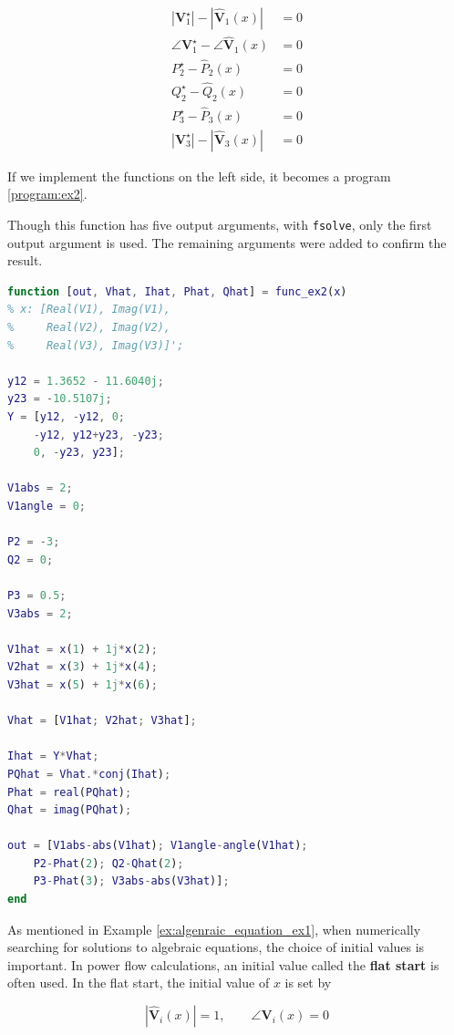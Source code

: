 \documentclass[graybox, envcountchap]{svmult}
\begin{document}
\begin{example}
\begin{equation*}
  \begin{aligned}
    |\bm V_1^{\star}|-|\hat{\bm V}_1(x)| &= 0\\
    \angle \bm V_1^{\star} - \angle \hat{\bm V}_1(x) &= 0\\
    P_2^{\star} -\hat P_2(x) &= 0\\
    Q_2^{\star} -\hat Q_2(x) &= 0\\
    P_3^{\star} -\hat P_3(x) &= 0\\
    |\bm V_3^{\star}|-|\hat{\bm V}_3(x)| &= 0
  \end{aligned}
\end{equation*}

If we implement the functions on the left side, it becomes a program \nobreak\ref{program:ex2}.

Though this function has five output arguments, with \texttt{fsolve}, only the first output argument is used.
The remaining arguments were added to confirm the result.

\begin{lstlisting}[language=Matlab, caption=func\_ex2.m, label={program:ex2}]
function [out, Vhat, Ihat, Phat, Qhat] = func_ex2(x)
% x: [Real(V1), Imag(V1),
%     Real(V2), Imag(V2),
%     Real(V3), Imag(V3)]';

y12 = 1.3652 - 11.6040j;
y23 = -10.5107j;
Y = [y12, -y12, 0;
    -y12, y12+y23, -y23;
    0, -y23, y23];

V1abs = 2;
V1angle = 0;

P2 = -3;
Q2 = 0;

P3 = 0.5;
V3abs = 2;

V1hat = x(1) + 1j*x(2);
V2hat = x(3) + 1j*x(4);
V3hat = x(5) + 1j*x(6);

Vhat = [V1hat; V2hat; V3hat];

Ihat = Y*Vhat;
PQhat = Vhat.*conj(Ihat);
Phat = real(PQhat);
Qhat = imag(PQhat);

out = [V1abs-abs(V1hat); V1angle-angle(V1hat);
    P2-Phat(2); Q2-Qhat(2);
    P3-Phat(3); V3abs-abs(V3hat)];
end
\end{lstlisting}

As mentioned in Example \ref{ex:algenraic_equation_ex1}, when numerically
searching for solutions to algebraic equations, the choice of initial values is
important. In power flow calculations, an initial value called the \textbf{flat
start} is often used. In the flat start, the initial value of $x$ is set by

\[
  |\hat{\bm V}_i(x)|=1
  ,\qquad
  \angle \bm V_i(x) = 0
\]


\end{example}
\end{document}

